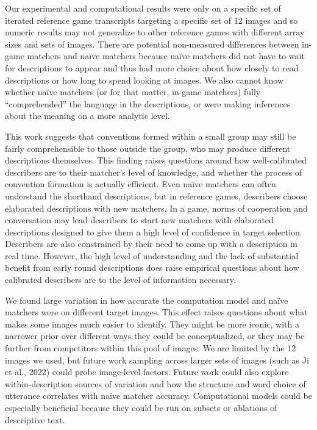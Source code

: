 \documentclass[10pt, letterpaper]{article}
\begin{document}
Our experimental and computational results were only on a specific set
of iterated reference game transcripts targeting a specific set of 12
images and so numeric results may not generalize to other reference
games with different array sizes and sets of images. There are potential
non-measured differences between in-game matchers and naïve matchers
because naïve matchers did not have to wait for descriptions to appear
and thus had more choice about how closely to read descriptions or how
long to spend looking at images. We also cannot know whether naïve
matchers (or for that matter, in-game matchers) fully ``comprehended''
the language in the descriptions, or were making inferences about the
meaning on a more analytic level.

This work suggests that conventions formed within a small group may
still be fairly comprehensible to those outside the group, who may
produce different descriptions themselves. This finding raises questions
around how well-calibrated describers are to their matcher's level of
knowledge, and whether the process of convention formation is actually
efficient. Even naïve matchers can often understand the shorthand
descriptions, but in reference games, describers choose elaborated
descriptions with new matchers. In a game, norms of cooperation and
conversation may lead describers to start new matchers with elaborated
descriptions designed to give them a high level of confidence in target
selection. Describers are also constrained by their need to come up with
a description in real time. However, the high level of understanding and
the lack of substantial benefit from early round descriptions does raise
empirical questions about how calibrated describers are to the level of
information necessary.

We found large variation in how accurate the computation model and naïve
matchers were on different target images. This effect raises questions
about what makes some images much easier to identify. They might be more
iconic, with a narrower prior over different ways they could be
conceptualized, or they may be further from competitors within this pool
of images. We are limited by the 12 images we used, but future work
sampling across larger sets of images (such as Ji et al., 2022) could
probe image-level factors. Future work could also explore
within-description sources of variation and how the structure and word
choice of utterance correlates with naïve matcher accuracy.
Computational models could be especially beneficial because they could
be run on subsets or ablations of descriptive text.
\end{document}
